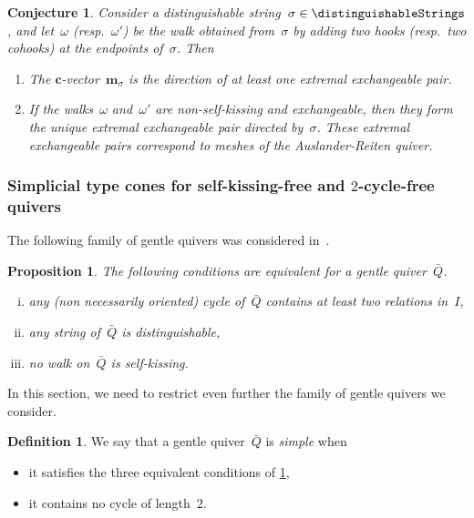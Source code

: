\documentclass{amsart}
\newtheorem{proposition}[theorem]{Proposition}
\newtheorem{conjecture}[theorem]{Conjecture}
\theoremstyle{definition}
\newtheorem{definition}[theorem]{Definition}
\renewcommand{\b}[1]{{\boldsymbol{#1}}} %
\newcommand{\darkblue}{\color{darkblue}} %
\newcommand{\defn}[1]{\textsl{\darkblue #1}} %
\newcommand{\multiplicityVector}{\b{m}} %
\newcommand{\quiver}{\bar Q} %
\begin{document}
\begin{conjecture}
Consider a distinguishable string~$\sigma \in \distinguishableStrings$, and let~$\omega$ (resp.~$\omega'$) be the walk obtained from~$\sigma$ by adding two hooks (resp.~two cohooks) at the endpoints of~$\sigma$. Then
\begin{enumerate}
\item The $\b{c}$-vector~$\multiplicityVector_\sigma$ is the direction of at least one extremal exchangeable pair.
\item If the walks~$\omega$ and~$\omega'$ are non-self-kissing and exchangeable, then they form the unique extremal exchangeable pair directed by~$\sigma$. These extremal exchangeable pairs correspond to meshes of the Auslander-Reiten quiver.
\end{enumerate}
\end{conjecture}

\subsubsection{Simplicial type cones for self-kissing-free and $2$-cycle-free quivers}
\label{subsubsec:simplicialTypeConeNKC}

The following family of gentle quivers was considered in~\cite[Sect.~4]{GarverMcConvilleMousavand}.

\begin{proposition}
\label{prop:noSelfKissing}
The following conditions are equivalent for a gentle quiver~$\quiver$.
\begin{enumerate}[(i)]
\item any (non necessarily oriented) cycle of~$\quiver$ contains at least two relations in~$I$,
\item any string of~$\quiver$ is distinguishable,
\item no walk on~$\quiver$ is self-kissing.
\end{enumerate}
\end{proposition}

In this section, we need to restrict even further the family of gentle quivers we consider.

\begin{definition}
We say that a gentle quiver~$\quiver$ is \defn{simple} when
\begin{itemize}
\item it satisfies the three equivalent conditions of \cref{prop:noSelfKissing},
\item it contains no cycle of length~$2$.
\end{itemize}
\end{definition}
\end{document}
